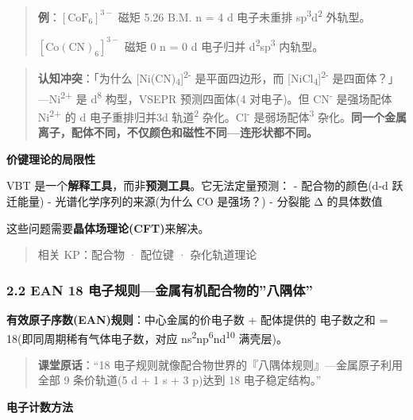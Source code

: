 \begin{quote}
\textbf{例}：\([\mathrm{CoF_6}]^{3-}\) 磁矩 5.26 B.M. \箭 n = 4 \箭 d 电子未重排 \箭 sp\textsuperscript{3}d\textsuperscript{2} 外轨型。

\([\mathrm{Co(CN)_6}]^{3-}\) 磁矩 0 \箭 n = 0 \箭 d 电子归并 \箭 d\textsuperscript{2}sp\textsuperscript{3} 内轨型。
\end{quote}

\begin{quote}
\textbf{认知冲突}：「为什么 {[}Ni(CN)\textsubscript{4}{]}\textsuperscript{2-} 是平面四边形，而 {[}NiCl\textsubscript{4}{]}\textsuperscript{2-} 是四面体？」---Ni\textsuperscript{2+} 是 d\textsuperscript{8} 构型，VSEPR 预测四面体(4 对电子)。但 CN\textsuperscript{-} 是强场配体 Ni\textsuperscript{2+} 的 d 电子重排归并 3d 轨道\textsuperscript{2} 杂化。Cl\textsuperscript{-} 是弱场配体\textsuperscript{3} 杂化。\textbf{同一个金属离子，配体不同，不仅颜色和磁性不同---连形状都不同。}
\end{quote}

\textbf{价键理论的局限性}

VBT 是一个\textbf{解释工具}，而非\textbf{预测工具}。它无法定量预测：
- 配合物的颜色(d-d 跃迁能量)
- 光谱化学序列的来源(为什么 CO 是强场？)
- 分裂能 Δ 的具体数值

这些问题需要\textbf{晶体场理论(CFT)}来解决。

\begin{quote}
相关 KP：配合物 · 配位键 · 杂化轨道理论
\end{quote}

\subsubsection{2.2 EAN 18 电子规则---金属有机配合物的''八隅体''}\label{ean-18-ux7535ux5b50ux89c4ux5219ux91d1ux5c5eux6709ux673aux914dux5408ux7269ux7684ux516bux9685ux4f53}

\textbf{有效原子序数(EAN)规则}：中心金属的价电子数 + 配体提供的  电子数之和 = 18(即同周期稀有气体电子数，对应 ns\textsuperscript{2}np\textsuperscript{6}nd\textsuperscript{10} 满壳层)。

\begin{quote}
\textbf{课堂原话}：``18 电子规则就像配合物世界的『八隅体规则』---金属原子利用全部 9 条价轨道(5 d + 1 s + 3 p)达到 18 电子稳定结构。''
\end{quote}

\textbf{电子计数方法}

